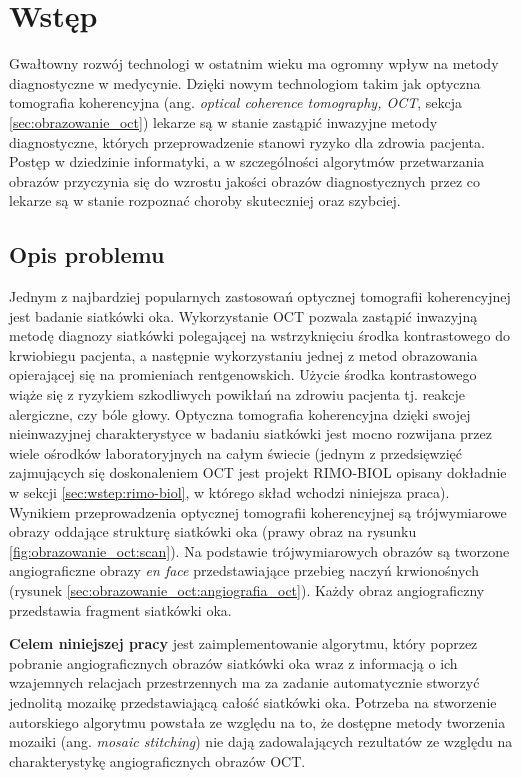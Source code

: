 %
\chapter{Wstęp}
\label{sec:wstep}

Gwałtowny rozwój technologi w ostatnim wieku ma ogromny wpływ na metody diagnostyczne w medycynie. Dzięki nowym technologiom takim jak optyczna tomografia koherencyjna (ang. \textit{optical coherence tomography, OCT}, sekcja \ref{sec:obrazowanie_oct}) lekarze są w stanie zastąpić inwazyjne metody diagnostyczne, których przeprowadzenie stanowi ryzyko dla zdrowia pacjenta. Postęp w dziedzinie informatyki, a w szczególności algorytmów przetwarzania obrazów przyczynia się do wzrostu jakości obrazów diagnostycznych przez co lekarze są w stanie rozpoznać choroby skuteczniej oraz szybciej.

\section{Opis problemu}
\label{sec:wstep:opis_problemu}

Jednym z najbardziej popularnych zastosowań optycznej tomografii koherencyjnej jest badanie siatkówki oka. Wykorzystanie OCT pozwala zastąpić inwazyjną metodę diagnozy siatkówki polegającej na wstrzyknięciu środka kontrastowego do krwiobiegu pacjenta, a następnie wykorzystaniu jednej z metod obrazowania opierającej się na promieniach rentgenowskich. Użycie środka kontrastowego wiąże się z ryzykiem szkodliwych powikłań na zdrowiu pacjenta tj. reakcje alergiczne, czy bóle głowy. Optyczna tomografia koherencyjna dzięki swojej nieinwazyjnej charakterystyce w badaniu siatkówki jest mocno rozwijana przez wiele ośrodków laboratoryjnych na całym świecie (jednym z przedsięwzięć zajmujących się doskonaleniem OCT jest projekt RIMO-BIOL opisany dokładnie w sekcji \ref{sec:wstep:rimo-biol}, w którego skład wchodzi niniejsza praca). Wynikiem przeprowadzenia optycznej tomografii koherencyjnej są trójwymiarowe obrazy oddające strukturę siatkówki oka (prawy obraz na rysunku \ref{fig:obrazowanie_oct:scan}). Na podstawie trójwymiarowych obrazów są tworzone angiograficzne obrazy \textit{en face} przedstawiające przebieg naczyń krwionośnych (rysunek \ref{sec:obrazowanie_oct:angiografia_oct}). Każdy obraz angiograficzny przedstawia fragment siatkówki oka.

\textbf{Celem niniejszej pracy} jest zaimplementowanie algorytmu, który poprzez pobranie angiograficznych obrazów siatkówki oka wraz z informacją o ich wzajemnych relacjach przestrzennych ma za zadanie automatycznie stworzyć jednolitą mozaikę przedstawiającą całość siatkówki oka. Potrzeba na stworzenie autorskiego algorytmu powstała ze względu na to, że dostępne metody tworzenia mozaiki (ang. \textit{mosaic stitching}) nie dają zadowalających rezultatów ze względu na charakterystykę angiograficznych obrazów OCT.

